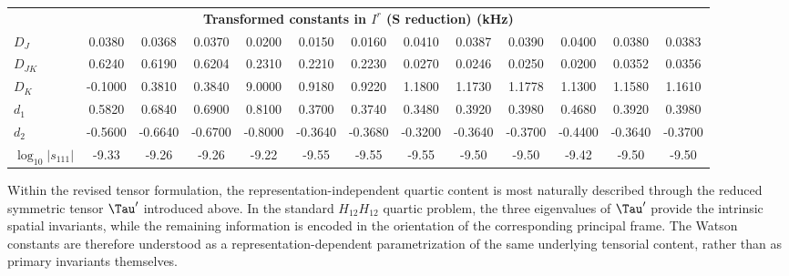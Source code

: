 \begin{table}[ht]
\begin{tabular}{lcccccccccccc}
  \midrule
  \multicolumn{13}{c}{\textbf{Transformed constants in $I^r$ (S reduction) (kHz)}} \\

  $D_J$ &
  0.0380 & 0.0368 & 0.0370 &
  0.0200 & 0.0150 & 0.0160 &
  0.0410 & 0.0387 & 0.0390 &
  0.0400 & 0.0380 & 0.0383 \\

  $D_{JK}$ &
  0.6240 & 0.6190 & 0.6204 &
  0.2310 & 0.2210 & 0.2230 &
  0.0270 & 0.0246 & 0.0250 &
  0.0200 & 0.0352 & 0.0356 \\

  $D_K$ &
  -0.1000 & 0.3810 & 0.3840 &
  9.0000 & 0.9180 & 0.9220 &
  1.1800 & 1.1730 & 1.1778 &
  1.1300 & 1.1580 & 1.1610 \\

  $d_1$ &
  0.5820 & 0.6840 & 0.6900 &
  0.8100 & 0.3700 & 0.3740 &
  0.3480 & 0.3920 & 0.3980 &
  0.4680 & 0.3920 & 0.3980 \\

  $d_2$ &
  -0.5600 & -0.6640 & -0.6700 &
  -0.8000 & -0.3640 & -0.3680 &
  -0.3200 & -0.3640 & -0.3700 &
  -0.4400 & -0.3640 & -0.3700 \\

  $\log_{10}|s_{111}|$ &
  -9.33 & -9.26 & -9.26 &
  -9.22 & -9.55 & -9.55 &
  -9.55 & -9.50 & -9.50 &
  -9.42 & -9.50 & -9.50 \\

  \bottomrule
  \end{tabular}

  \label{table:new_results}

\end{table}

Within the revised tensor formulation, the representation-independent quartic
content is most naturally described through the reduced symmetric tensor
$\Tau'$ introduced above.  In the standard $H_{12}H_{12}$ quartic problem,
the three eigenvalues of $\Tau'$ provide the intrinsic spatial invariants,
while the remaining information is encoded in the orientation of the
corresponding principal frame.  The Watson constants are therefore understood
as a representation-dependent parametrization of the same underlying tensorial
content, rather than as primary invariants themselves.

